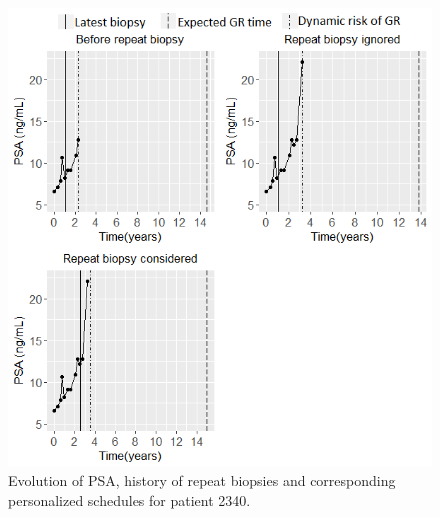 \begin{figure}
\centerline{\includegraphics[width=\columnwidth]{images/prias_demo/case_2340.png}}
\caption{Evolution of PSA, history of repeat biopsies and corresponding personalized schedules for patient 2340.}
\label{web_fig : prias_demo_pid_2340}
\end{figure}